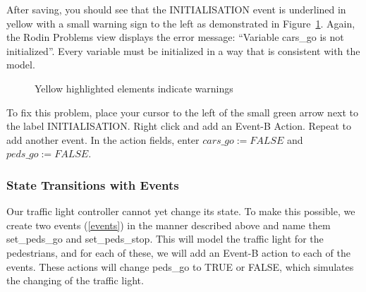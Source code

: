 After saving, you should see that the \textsf{INITIALISATION} event is underlined in yellow with a small warning sign to the left as demonstrated in Figure~\ref{fig_tut_03_warning}. Again, the \textsf{Rodin Problems} view displays the error message: ``Variable cars\_go is not initialized''. Every variable must be initialized in a way that is consistent with the model.

\begin{figure}[!ht]
\begin{center}
	\caption{Yellow highlighted elements indicate warnings}
	\label{fig_tut_03_warning}
\end{center}
\end{figure}

To fix this problem, place your cursor to the left of the small green arrow next to the label \textsf{INITIALISATION}. Right click and add an \textsf{Event-B Action}. Repeat to add another event. In the action fields, enter $cars\_go :=  FALSE$ and $peds\_go :=  FALSE$.



\subsubsection{State Transitions with Events}

Our traffic light controller cannot yet change its state.  To make this possible, we create two events (\ref{events}) in the manner described above and name them \textsf{set\_peds\_go} and \textsf{set\_peds\_stop}. This will model the traffic light for the pedestrians, and for each of these, we will add an Event-B action to each of the events. These actions will change \textsf{peds\_go} to \textsf{TRUE} or \textsf{FALSE}, which simulates the changing of the traffic light.


